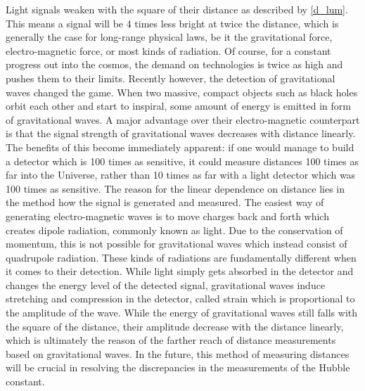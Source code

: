 Light signals weaken with the square of their distance as described by
\eqref{d_lum}.  This means a signal will be 4 times less bright at twice the
distance, which is generally the case for long-range physical laws, be it the
gravitational force, electro-magnetic force, or most kinds of radiation.  Of
course, for a constant progress out into the cosmos, the demand on technologies
is twice as high and pushes them to their limits.  
Recently however, the detection of gravitational waves changed the game.  When
two massive, compact objects such as black holes orbit each other and start to
inspiral, some amount of energy is emitted in form of gravitational
waves.  A major advantage over their
electro-magnetic counterpart is that the signal strength of gravitational waves
decreases with distance linearly.  The benefits of this become immediately
apparent: if one would manage to build a detector which is 100 times as
sensitive, it could measure distances 100 times as far into the Universe, rather
than 10 times as far with a light detector which was 100 times as sensitive.
The reason for the linear dependence on distance lies in the method how the
signal is generated and measured.  The easiest way of generating
electro-magnetic waves is to move charges back and forth which creates dipole
radiation, commonly known as light.  Due to the conservation of momentum, this
is not possible for gravitational waves which instead consist of quadrupole
radiation.  These kinds of radiations are fundamentally different when it comes
to their detection.  While light simply gets absorbed in the detector and
changes the energy level of the detected signal, gravitational waves induce
stretching and compression in the detector, called strain which is proportional
to the amplitude of the wave.  While the energy of gravitational waves still
falls with the square of the distance, their amplitude decrease with the
distance linearly, which is ultimately the reason of the farther reach of
distance measurements based on gravitational waves.  In the future, this method
of measuring distances will be crucial in resolving the discrepancies in the
measurements of the Hubble constant.
